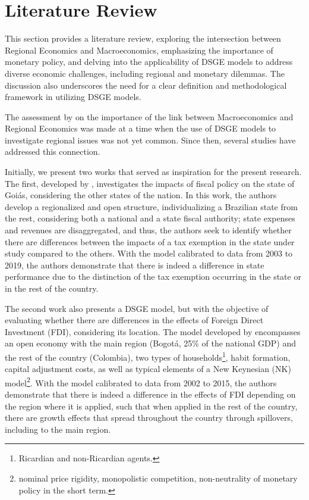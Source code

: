 \documentclass[../thesis.tex]{subfiles}
\begin{document}
\newpage

\section{Literature Review}\label{sec:literature-review}

This section provides a literature review, exploring the intersection between Regional Economics and Macroeconomics, emphasizing the importance of monetary policy, and delving into the applicability of DSGE models to address diverse economic challenges, including regional and monetary dilemmas. The discussion also underscores the need for a clear definition and methodological framework in utilizing DSGE models.


The assessment by \textcite{rickman_modern_2010} on the importance of the link between Macroeconomics and Regional Economics was made at a time when the use of DSGE models to investigate regional issues was not yet common. Since then, several studies have addressed this connection.

Initially, we present two works that served as inspiration for the present research. The first, developed by \textcite{costa_junior_dsge_2022}, investigates the impacts of fiscal policy on the state of Goiás, considering the other states of the nation. In this work, the authors develop a regionalized and open structure, individualizing a Brazilian state from the rest, considering both a national and a state fiscal authority; state expenses and revenues are disaggregated, and thus, the authors seek to identify whether there are differences between the impacts of a tax exemption in the state under study compared to the others. With the model calibrated to data from 2003 to 2019, the authors demonstrate that there is indeed a difference in state performance due to the distinction of the tax exemption occurring in the state or in the rest of the country.

The second work also presents a DSGE model, but with the objective of evaluating whether there are differences in the effects of Foreign Direct Investment (FDI), considering its location. The model developed by \textcite{mora_fdi_2019} encompasses an open economy with the main region (Bogotá, 25\% of the national GDP) and the rest of the country (Colombia), two types of households\footnote{ Ricardian and non-Ricardian agents.}, habit formation, capital adjustment costs, as well as typical elements of a New Keynesian (NK) model\footnote{ nominal price rigidity, monopolistic competition, non-neutrality of monetary policy in the short term.}. With the model calibrated to data from 2002 to 2015, the authors demonstrate that there is indeed a difference in the effects of FDI depending on the region where it is applied, such that when applied in the rest of the country, there are growth effects that spread throughout the country through spillovers, including to the main region.
\end{document}
